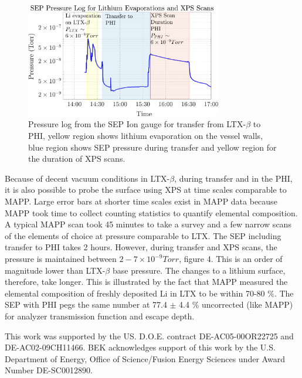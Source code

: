 \documentclass[aip,rsi,amsmath,amssymb,reprint]{revtex4-1}
\begin{document}
\begin{figure}%
\centering
\includegraphics[width=3.37in,keepaspectratio]{04012019_Transferlog}%
\caption{Pressure log from the SEP Ion gauge for transfer from LTX-$\beta$ to PHI, yellow region shows lithium evaporation on the vessel walls, blue region shows SEP pressure during transfer and yellow region for the duration of XPS scans.}
\end{figure}

Because of decent vacuum conditions in LTX-$\beta$, during transfer and in the PHI, it is also possible to probe the surface using XPS at time scales comparable to MAPP. Large error bars at shorter time scales exist in MAPP data because MAPP took time to collect counting statistics to quantify elemental composition. A typical MAPP scan took 45 minutes to take a survey and a few narrow scans of the elements of choice at pressure comparable to LTX. The SEP including transfer to PHI takes 2 hours. However, during transfer and XPS scans, the pressure is maintained between $2-7 \times 10^{-9} Torr$, figure 4. This is an order of magnitude lower than LTX-$\beta$ base pressure. The changes to a lithium surface, therefore, take longer. This is illustrated by the fact that MAPP measured the elemental composition of freshly deposited Li in LTX to be within 70-80 \%. The SEP with PHI pegs the same number at 77.4 $\pm$ 4.4 \% uncorrected (like MAPP) for analyzer transmission function and escape depth.

\begin{acknowledgments}
This work was supported by the US. D.O.E. contract DE-AC05-00OR22725 and DE-AC02-09CH11466. BEK acknowledges support of this work by the U.S. Department of Energy, Office of Science/Fusion Energy Sciences under Award Number DE-SC0012890.

\end{acknowledgments}


\end{document}
